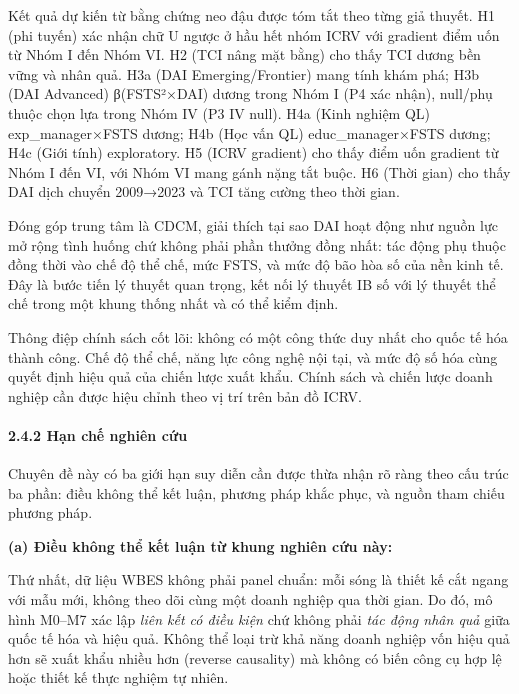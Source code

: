 \documentclass[12pt,a4paper]{article}
\begin{document}
Kết quả dự kiến từ bằng chứng neo đậu được tóm tắt theo từng giả thuyết.
H1 (phi tuyến) xác nhận chữ U ngược ở hầu hết nhóm ICRV với gradient
điểm uốn từ Nhóm I đến Nhóm VI. H2 (TCI nâng mặt bằng) cho thấy TCI
dương bền vững và nhân quả. H3a (DAI Emerging/Frontier) mang tính khám
phá; H3b (DAI Advanced) β(FSTS²×DAI) dương trong Nhóm I (P4 xác nhận),
null/phụ thuộc chọn lựa trong Nhóm IV (P3 IV null). H4a (Kinh nghiệm QL)
exp\_manager×FSTS dương; H4b (Học vấn QL) educ\_manager×FSTS dương; H4c
(Giới tính) exploratory. H5 (ICRV gradient) cho thấy điểm uốn gradient
từ Nhóm I đến VI, với Nhóm VI mang gánh nặng tắt buộc. H6 (Thời gian)
cho thấy DAI dịch chuyển 2009→2023 và TCI tăng cường theo thời gian.

Đóng góp trung tâm là CDCM, giải thích tại sao DAI hoạt động như nguồn
lực mở rộng tình huống chứ không phải phần thưởng đồng nhất: tác động
phụ thuộc đồng thời vào chế độ thể chế, mức FSTS, và mức độ bão hòa số
của nền kinh tế. Đây là bước tiến lý thuyết quan trọng, kết nối lý
thuyết IB số với lý thuyết thể chế trong một khung thống nhất và có thể
kiểm định.

Thông điệp chính sách cốt lõi: không có một công thức duy nhất cho quốc
tế hóa thành công. Chế độ thể chế, năng lực công nghệ nội tại, và mức độ
số hóa cùng quyết định hiệu quả của chiến lược xuất khẩu. Chính sách và
chiến lược doanh nghiệp cần được hiệu chỉnh theo vị trí trên bản đồ
ICRV.

\hypertarget{242-hux1ea1n-chux1ebf-nghiuxean-cux1ee9u}{%
\paragraph{2.4.2 Hạn chế nghiên
cứu}\label{242-hux1ea1n-chux1ebf-nghiuxean-cux1ee9u}}

Chuyên đề này có ba giới hạn suy diễn cần được thừa nhận rõ ràng theo
cấu trúc ba phần: điều không thể kết luận, phương pháp khắc phục, và
nguồn tham chiếu phương pháp.

\textbf{(a) Điều không thể kết luận từ khung nghiên cứu này:}

Thứ nhất, dữ liệu WBES không phải panel chuẩn: mỗi sóng là thiết kế cắt
ngang với mẫu mới, không theo dõi cùng một doanh nghiệp qua thời gian.
Do đó, mô hình M0--M7 xác lập \emph{liên kết có điều kiện} chứ không
phải \emph{tác động nhân quả} giữa quốc tế hóa và hiệu quả. Không thể
loại trừ khả năng doanh nghiệp vốn hiệu quả hơn sẽ xuất khẩu nhiều hơn
(reverse causality) mà không có biến công cụ hợp lệ hoặc thiết kế thực
nghiệm tự nhiên.
\end{document}

